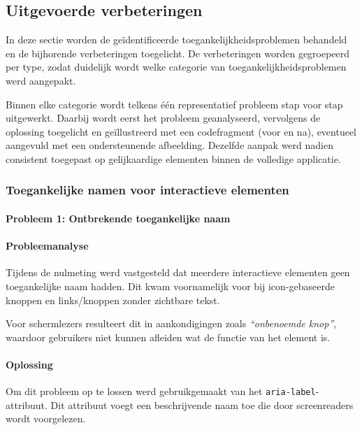 \subsection{Uitgevoerde verbeteringen}
\label{subsec:uitgevoerde-verbeteringen}

In deze sectie worden de geïdentificeerde toegankelijkheidsproblemen behandeld en de bijhorende verbeteringen toegelicht. 
De verbeteringen worden gegroepeerd per type, zodat duidelijk wordt welke categorie van toegankelijkheidsproblemen werd aangepakt.

Binnen elke categorie wordt telkens één representatief probleem stap voor stap uitgewerkt. 
Daarbij wordt eerst het probleem geanalyseerd, vervolgens de oplossing toegelicht en geïllustreerd met een codefragment (voor en na), eventueel aangevuld met een ondersteunende afbeelding.
Dezelfde aanpak werd nadien consistent toegepast op gelijkaardige elementen binnen de volledige applicatie.

\subsubsection{Toegankelijke namen voor interactieve elementen}

\paragraph{Probleem 1: Ontbrekende toegankelijke naam}

\paragraph{Probleemanalyse}

Tijdens de nulmeting werd vastgesteld dat meerdere interactieve elementen geen toegankelijke naam hadden. 
Dit kwam voornamelijk voor bij icon-gebaseerde knoppen en links/knoppen zonder zichtbare tekst.

Voor schermlezers resulteert dit in aankondigingen zoals \textit{``onbenoemde knop''}, 
waardoor gebruikers niet kunnen afleiden wat de functie van het element is.

\paragraph{Oplossing}

Om dit probleem op te lossen werd gebruikgemaakt van het \texttt{aria-label}-attribuut. 
Dit attribuut voegt een beschrijvende naam toe die door screenreaders wordt voorgelezen.

